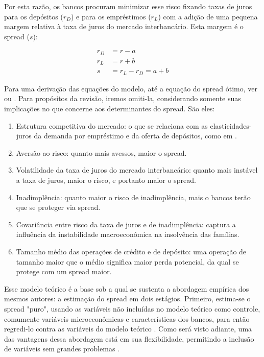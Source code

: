 \documentclass[a4paper,
               article,
               12pt,
               openany,
               oneside,
               english,
               brazil]{abntex2}
\numberwithin{equation}{section}
\begin{document}
    Por esta razão, os bancos procuram minimizar esse risco fixando taxas de juros para os depósitos ($r_D$) e para os empréstimos ($r_L$) com a adição de uma pequena margem relativa à taxa de juros do mercado interbancário. Esta margem é o spread ($s$):

	\begin{align}
        r_D &= r - a \\
        r_L &= r + b \\
        s &= r_L - r_D = a + b
	\end{align}

    Para uma derivação das equações do modelo, até a equação do spread ótimo, ver \textcite[p.~2262]{maudos} ou \textcite[p.~584]{hoesaunders}. Para propósitos da revisão, iremos omiti-la, considerando somente suas implicações no que concerne aos determinantes do spread. São eles:

	\begin{enumerate}
		\item Estrutura competitiva do mercado: o que se relaciona com as elasticidades-juros da demanda por empréstimo e da oferta de depósitos, como em \textcite{klein}.
		\item Aversão ao risco: quanto mais avessos, maior o spread.
		\item Volatilidade da taxa de juros do mercado interbancário: quanto mais instável a taxa de juros, maior o risco, e portanto maior o spread.
		\item Inadimplência: quanto maior o risco de inadimplência, mais o bancos terão que se proteger via spread.
		\item Covariância entre risco da taxa de juros e de inadimplência: captura a influência da instabilidade macroeconômica na insolvência das famílias. \cite{oreiro}
		\item Tamanho médio das operações de crédito e de depósito: uma operação de tamanho maior que o médio significa maior perda potencial, da qual se protege com um spread maior.
	\end{enumerate}

    Esse modelo teórico é a base sob a qual se sustenta a abordagem empírica dos mesmos autores: a estimação do spread em dois estágios. Primeiro, estima-se o spread "puro", usando as variáveis não incluídas no modelo teórico como controle, comumente variáveis microeconômicas e características dos bancos, para então regredi-lo contra as variáveis do modelo teórico \textcite{maudos}. Como será visto adiante, uma das vantagens dessa abordagem está em sua flexibilidade, permitindo a inclusão de variáveis sem grandes problemas \textcite[p.~2]{almeida15}.
\end{document}
